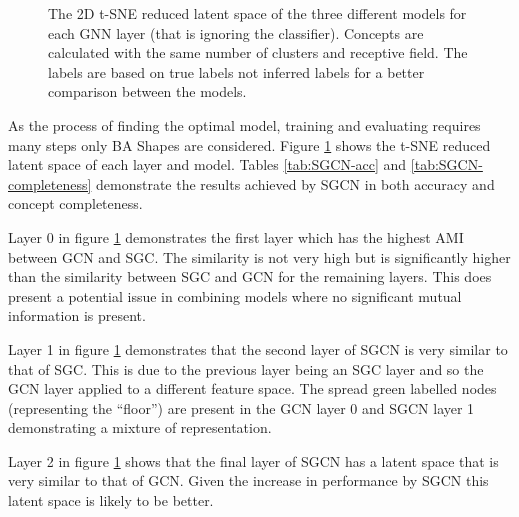 \begin{figure}
    \caption{The 2D t-SNE reduced latent space of the three different models for each GNN layer (that is ignoring the classifier). Concepts are calculated with the same number of clusters and receptive field. The labels are based on true labels not inferred labels for a better comparison between the models.}
    \label{fig:SGCN-latent-spaces}
\end{figure}




As the process of finding the optimal model, training and evaluating requires many steps only BA Shapes are considered.
Figure \ref{fig:SGCN-latent-spaces} shows the t-SNE reduced latent space of each layer and model.
Tables \ref{tab:SGCN-acc} and \ref{tab:SGCN-completeness} demonstrate the results achieved by SGCN in both accuracy and concept completeness.

Layer 0 in figure \ref{fig:SGCN-latent-spaces} demonstrates the first layer which has the highest AMI between GCN and SGC.
The similarity is not very high but is significantly higher than the similarity between SGC and GCN for the remaining layers.
This does present a potential issue in combining models where no significant mutual information is present.

Layer 1 in figure \ref{fig:SGCN-latent-spaces} demonstrates that the second layer of SGCN is very similar to that of SGC.
This is due to the previous layer being an SGC layer and so the GCN layer applied to a different feature space.
The spread green labelled nodes (representing the ``floor'') are present in the GCN layer 0 and SGCN layer 1 demonstrating a mixture of representation.

Layer 2 in figure \ref{fig:SGCN-latent-spaces} shows that the final layer of SGCN has a latent space that is very similar to that of GCN.
Given the increase in performance by SGCN this latent space is likely to be better.


